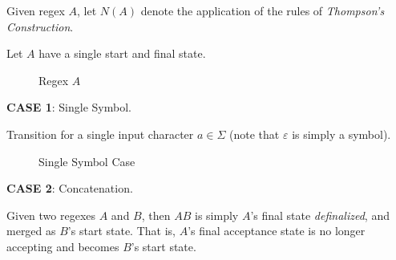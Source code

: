 \begin{definition}
    Given regex $A$, let $N(A)$ denote the application of the rules of \textit{Thompson's Construction}.
    
    Let $A$ have a single start and final state.
    \begin{figure}[H]
        \centering
        \caption{Regex $A$}
        \label{fig:thompson-notation}
    \end{figure}
    
    \textbf{CASE 1}: Single Symbol.
    
    Transition for a single input character $a \in \Sigma$ (note that $\varepsilon$ is simply a symbol).
    
    \begin{figure}[H]
        \centering
        \caption{Single Symbol Case}
        \label{fig:thompson-single-symbol}
    \end{figure}
    
    \textbf{CASE 2}: Concatenation.
    
    Given two regexes $A$ and $B$, then $AB$ is simply $A$'s final state \textit{definalized}, and merged as $B$'s start state. That is, $A$'s final acceptance state is no longer accepting and becomes $B$'s start state.
    

\end{definition}

